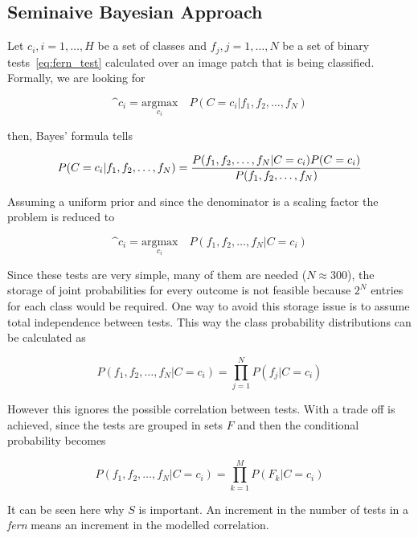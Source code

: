 \subsection{Seminaive Bayesian Approach}
\label{sub:seminaive_bayesian_approach}

Let $c_i, i = 1,\ldots,H$ be a set of classes and $f_j, j=1,\ldots,N$ be a set of binary tests~\ref{eq:fern_test} calculated over an image patch that is being classified. Formally, we are looking for

\begin{equation}
  \^c_i = \underset{c_i}{\text{argmax}} \quad P(C = c_i | f_1, f_2, \ldots, f_N)
\end{equation}

then, Bayes' formula tells

\begin{equation}
  P(C = c_i | f_1, f_2, \ldots, f_N) = \frac{P(f_1,f_2,\ldots,f_N \arrowvert C=c_i) P(C=c_i)}{P(f_1,f_2,\ldots,f_N)}
\end{equation}

Assuming a uniform prior and since the denominator is a scaling factor the problem is reduced to

\begin{equation}
  \^c_i = \underset{c_i}{\text{argmax}} \quad P(f_1, f_2, \ldots, f_N | C = c_i)
\end{equation}

Since these tests are very simple, many of them are needed ($N \approx 300$), the storage of joint probabilities for every outcome is not feasible because $2^N$ entries for each class would be required. One way to avoid this storage issue is to assume total independence between tests. This way the class probability distributions can be calculated as

\begin{equation}
  P(f_1, f_2, \ldots, f_N | C = c_i) = \prod^{N}_{j=1}P(f_j | C = c_i)
\end{equation}

However this ignores the possible correlation between tests. With  a trade off is achieved, since the tests are grouped in sets $F$ and then the conditional probability becomes

\begin{equation}
  P(f_1, f_2, \ldots, f_N | C = c_i) = \prod^{M}_{k=1} P(F_k | C = c_i)
\end{equation}

It can be seen here why $S$ is important. An increment in the number of tests in a \textit{fern} means an increment in the modelled correlation.\\

